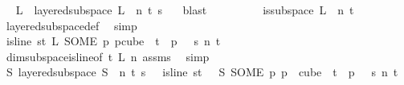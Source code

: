 \begin{isabellebody}
\ \isamarkupfalse%
\ L\ \ {\isachardoublequoteopen}layered{\isacharunderscore}{\kern0pt}subspace\ L\ {}\ n\ t\ s\ {\isasymchi}{\isachardoublequoteclose}\ \isamarkupfalse%
\ blast\isanewline
\ \ \ \ \ \ \isamarkupfalse%
\ \isamarkupfalse%
\ {\isachardoublequoteopen}is{\isacharunderscore}{\kern0pt}subspace\ L\ {}\ n\ {\isacharparenleft}{\kern0pt}t{\isacharplus}{\kern0pt}{}{\isacharparenright}{\kern0pt}{\isachardoublequoteclose}\ \isamarkupfalse%
\ layered{\isacharunderscore}{\kern0pt}subspace{\isacharunderscore}{\kern0pt}def\ \isamarkupfalse%
\ simp\isanewline
\ \ \ \ \ \ \isamarkupfalse%
\ \isamarkupfalse%
\ {\isachardoublequoteopen}is{\isacharunderscore}{\kern0pt}line\ {\isacharparenleft}{\kern0pt}{\isasymlambda}s{\isasymin}{\isacharbraceleft}{\kern0pt}{\isachardot}{\kern0pt}{\isachardot}{\kern0pt}{\isacharless}{\kern0pt}t{\isacharplus}{\kern0pt}{}{\isacharbraceright}{\kern0pt}{\isachardot}{\kern0pt}\ L\ {\isacharparenleft}{\kern0pt}SOME\ p{\isachardot}{\kern0pt}\ p{\isasymin}cube\ {}\ {\isacharparenleft}{\kern0pt}t{\isacharplus}{\kern0pt}{}{\isacharparenright}{\kern0pt}\ {\isasymand}\ p\ {}\ {\isacharequal}{\kern0pt}\ s{\isacharparenright}{\kern0pt}{\isacharparenright}{\kern0pt}\ n\ {\isacharparenleft}{\kern0pt}t\ {\isacharplus}{\kern0pt}\ {}{\isacharparenright}{\kern0pt}{\isachardoublequoteclose}\ \isamarkupfalse%
\ dim{}{\isacharunderscore}{\kern0pt}subspace{\isacharunderscore}{\kern0pt}is{\isacharunderscore}{\kern0pt}line{\isacharbrackleft}{\kern0pt}of\ {\isachardoublequoteopen}t{\isacharplus}{\kern0pt}{}{\isachardoublequoteclose}\ {\isachardoublequoteopen}L{\isachardoublequoteclose}\ {\isachardoublequoteopen}n{\isachardoublequoteclose}{\isacharbrackright}{\kern0pt}\ assms{\isacharparenleft}{\kern0pt}{}{\isacharparenright}{\kern0pt}\ \isamarkupfalse%
\ simp\isanewline
\ \ \ \ \ \ \isamarkupfalse%
\ \isamarkupfalse%
\ {\isachardoublequoteopen}{\isasymexists}S{\isachardot}{\kern0pt}\ layered{\isacharunderscore}{\kern0pt}subspace\ S\ {}\ n\ t\ s\ {\isasymchi}\ {\isasymand}\ is{\isacharunderscore}{\kern0pt}line\ {\isacharparenleft}{\kern0pt}{\isasymlambda}s{\isasymin}{\isacharbraceleft}{\kern0pt}{\isachardot}{\kern0pt}{\isachardot}{\kern0pt}{\isacharless}{\kern0pt}t\ {\isacharplus}{\kern0pt}\ {}{\isacharbraceright}{\kern0pt}{\isachardot}{\kern0pt}\ S\ {\isacharparenleft}{\kern0pt}SOME\ p{\isachardot}{\kern0pt}\ p\ {\isasymin}\ cube\ {}\ {\isacharparenleft}{\kern0pt}t{\isacharplus}{\kern0pt}{}{\isacharparenright}{\kern0pt}\ {\isasymand}\ p\ {}\ {\isacharequal}{\kern0pt}\ s{\isacharparenright}{\kern0pt}{\isacharparenright}{\kern0pt}\ n\ {\isacharparenleft}{\kern0pt}t\ {\isacharplus}{\kern0pt}\ {}{\isacharparenright}{\kern0pt}{\isachardoublequoteclose}\ \isamarkupfalse%

\end{isabellebody}
